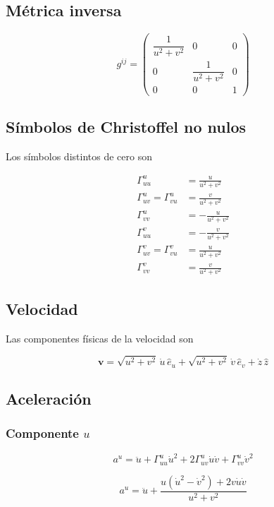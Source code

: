 \documentclass[12pt]{article}
\begin{document}
\subsection{Métrica inversa}

\[
g^{ij}
=
\begin{pmatrix}
\dfrac1{u^2+v^2}&0&0\\
0&
\dfrac1{u^2+v^2}&0\\
0&0&1
\end{pmatrix}
\]

\subsection{Símbolos de Christoffel no nulos}

Los símbolos distintos de cero son

\begin{align}
\Gamma^u_{uu}
&=
\frac{u}{u^2+v^2}
\\
\Gamma^u_{uv}
=
\Gamma^u_{vu}
&=
\frac{v}{u^2+v^2}
\\
\Gamma^u_{vv}
&=
-\frac{u}{u^2+v^2}
\\
\Gamma^v_{uu}
&=
-\frac{v}{u^2+v^2}
\\
\Gamma^v_{uv}
=
\Gamma^v_{vu}
&=
\frac{u}{u^2+v^2}
\\
\Gamma^v_{vv}
&=
\frac{v}{u^2+v^2}
\end{align}

\subsection{Velocidad}

Las componentes físicas de la velocidad son

\[
\boxed{
\mathbf v
=
\sqrt{u^2+v^2}\,
\dot u\,\hat e_u
+
\sqrt{u^2+v^2}\,
\dot v\,\hat e_v
+
\dot z\,\hat z
}
\]

\subsection{Aceleración}

\subsubsection*{Componente \(u\)}

\[
a^u=
\ddot u
+
\Gamma^u_{uu}\dot u^2
+
2\Gamma^u_{uv}\dot u\dot v
+
\Gamma^u_{vv}\dot v^2
\]

\[
\boxed{
a^u=
\ddot u
+
\frac{
u(\dot u^2-\dot v^2)
+
2v\dot u\dot v
}
{u^2+v^2}
}
\]
\end{document}
